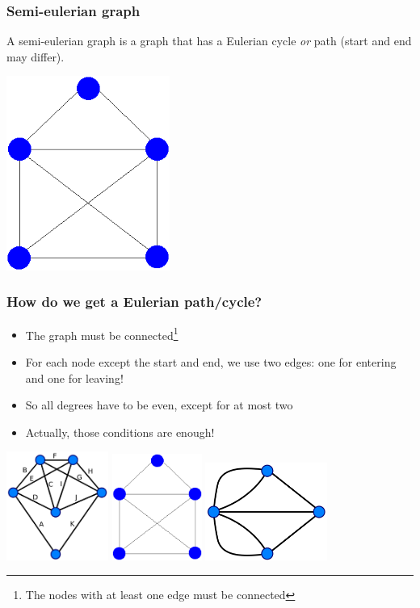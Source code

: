 \documentclass[12pt]{beamer}
\begin{document}
\begin{frame}
\frametitle{Semi-eulerian graph}
A semi-eulerian graph is a graph that has a Eulerian cycle \emph{or} path (start and end may differ).
\begin{center}
\includegraphics[width=0.4\textwidth]{img/semi-eulerian}
\end{center}
\end{frame}

\begin{frame}
\frametitle{How do we get a Eulerian path/cycle?}
\begin{itemize}
\item The graph must be connected\footnote{The nodes with at least one edge must be connected}
\item For each node except the start and end, we use two edges: one for entering and one for leaving!
\item So all degrees have to be even, except for at most two
\item Actually, those conditions are enough!
\end{itemize}
\begin{center}
\includegraphics[width=0.25\textwidth]{img/euler-graph}
\qquad
\includegraphics[width=0.22\textwidth]{img/semi-eulerian}
\qquad
\includegraphics[width=0.3\textwidth]{img/konigsberg}
\end{center}
\end{frame}
\end{document}
